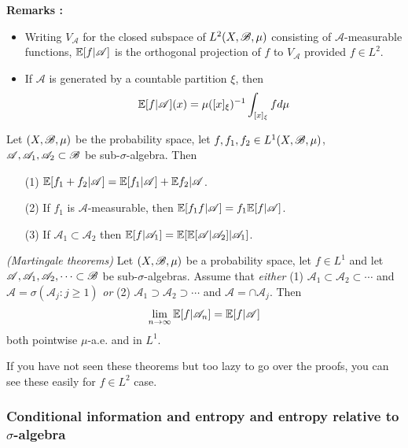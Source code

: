 \documentclass[12pt,a4paper]{report}
\begin{document}
\textbf{Remarks :}
\begin{itemize}
\item Writing $V_{\mathscr{A}}$ for the closed subspace of $L^2(X,\mathscr{B}, \mu)$ consisting of $\mathscr{A}$-measurable functions, $\mathbb{E}[f|\mathscr{A}]$ is the orthogonal projection of $f$ to $V_{\mathscr{A}}$ provided $f\in L^2$. 
\item If $\mathscr{A}$ is generated by a countable partition $\xi$, then
\begin{align*}
\mathbb{E}[f | \mathscr{A}](x)  = \mu([x]_{\xi})^{-1} \int_{[x]_{\xi}} fd\mu
\end{align*}
\end{itemize}
\s

\thm Let $(X, \mathscr{B}, \mu)$ be the probability space, let $f,f_1,f_2\in L^1(X, \mathscr{B}, \mu)$, $\mathscr{A},\mathscr{A}_1,\mathscr{A}_2 \subset \mathscr{B}$ be sub-$\sigma$-algebra. Then
\begin{itemize}
\item[(1)] $\mathbb{E}[f_1 + f_2 | \mathscr{A}] = \mathbb{E}[f_1 |\mathscr{A}] + \mathbb{E}{f_2 | \mathscr{A}}$.
\item[(2)] If $f_1$ is $\mathscr{A}$-measurable, then $\mathbb{E}[f_1 f | \mathscr{A}] = f_1 \mathbb{E}[f|\mathscr{A}]$.
\item[(3)] If $\mathscr{A}_1 \subset \mathscr{A}_2$ then $\mathbb{E}[f|\mathscr{A}_1] = \mathbb{E}[\mathbb{E}[\mathscr{A}|\mathscr{A}_2]|\mathscr{A}_1]$.
\end{itemize}
\s

\thm \emph{(Martingale theorems)} Let $(X,\mathscr{B}, \mu)$ be a probability space, let $f\in L^1$ and let $\mathscr{A},\mathscr{A}_1,\mathscr{A}_2, \cdots \subset \mathscr{B}$ be sub-$\sigma$-algebras. Assume that \emph{either} (1) $\mathscr{A}_1 \subset \mathscr{A}_2 \subset \cdots$ and $\mathscr{A} = \sigma(\mathscr{A}_j : j\geq 1)$ \emph{or} (2) $\mathscr{A}_1 \supset \mathscr{A}_2 \supset \cdots$ and $\mathscr{A} = \cap \mathscr{A}_j$. Then
\begin{align*}
\lim_{n\rightarrow \infty} \mathbb{E}[f| \mathscr{A}_n] = \mathbb{E}[f|\mathscr{A}]
\end{align*}
both pointwise $\mu$-a.e. and in $L^1$.
\s

If you have not seen these theorems but too lazy to go over the proofs, you can see these easily for $f\in L^2$ case.

\subsubsection*{Conditional information and entropy and entropy relative to $\sigma$-algebra}
\end{document}
